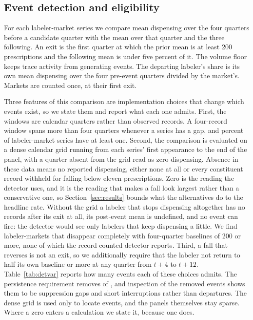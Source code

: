 \documentclass[pdflatex,sn-vancouver-num,Numbered]{sn-jnl}
\begin{document}
\subsection{Event detection and eligibility}\label{subsec:treat}

For each labeler-market series we compare mean dispensing over the four quarters before a
candidate quarter with the mean over that quarter and the three following. An exit is the first
quarter at which the prior mean is at least 200 prescriptions and the following mean is under
five percent of it. The volume floor keeps trace activity from generating events. The departing
labeler's share is its own mean dispensing over the four pre-event quarters divided by the
market's. Markets are counted once, at their first exit.

Three features of this comparison are implementation choices that change which events exist, so
we state them and report what each one admits. First, the windows are calendar quarters rather
than observed records. A four-record window spans more than four quarters whenever a series has
a gap, and \nGappyPct percent of labeler-market series have at least one. Second, the comparison
is evaluated on a dense calendar grid running from each series' first appearance to the end of
the panel, with a quarter absent from the grid read as zero dispensing. Absence in these data
means no reported dispensing, either none at all or every constituent record withheld for falling
below eleven prescriptions. Zero is the reading the detector uses, and it is the reading that makes
a fall look largest rather than a conservative one, so Section~\ref{sec:results} bounds what the
alternatives do to the headline rate.
Without the grid a labeler that stops dispensing altogether has no records after its exit at
all, its post-event mean is undefined, and no event can fire: the detector would see only
labelers that keep dispensing a little. We find \nVanishUndetected labeler-markets that
disappear completely with four-quarter baselines of 200 or more, none of which the
record-counted detector reports. Third, a fall that reverses is not an exit, so we additionally
require that the labeler not return to half its own baseline or more at any quarter from $t+4$ to
$t+12$. Table~\ref{tab:detvar} reports how many events each of these choices admits. The
persistence requirement removes \nDetDipsRemoved of \nDetRangeDense, and inspection of the
removed events shows them to be suppression gaps and short interruptions rather than departures.
The dense grid is used only to locate events, and the panels themselves stay sparse. Where a
zero enters a calculation we state it, because one does.
\end{document}
